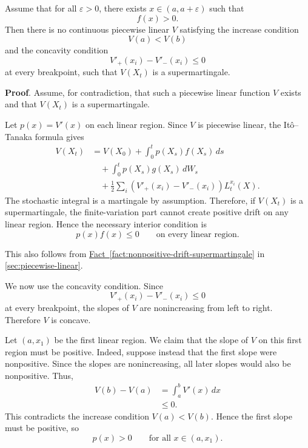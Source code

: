 \begin{fact}
Assume that for all $\varepsilon>0$, there exists
$x\in(a,a+\varepsilon)$ such that
\begin{equation}
f(x)>0.
\label{eq:positive-drift-arbitrarily-close}
\end{equation}
Then there is no continuous piecewise linear $V$ satisfying the increase
condition
\begin{equation}
V(a)<V(b)
\end{equation}
and the concavity condition
\begin{equation}
V'_{+}(x_i)-V'_{-}(x_i)\leq 0
\end{equation}
at every breakpoint, such that $V(X_t)$ is a supermartingale.

\textbf{Proof}. Assume, for contradiction, that such a piecewise linear function $V$ exists
and that $V(X_t)$ is a supermartingale.

Let $p(x)=V'(x)$ on each linear region. Since $V$ is piecewise linear, the
Itô--Tanaka formula gives
\begin{align}
    V(X_t)
    &=
    V(X_0)
    +
    \int_0^t p(X_s)f(X_s)\,ds                                      \\
    &\quad
    +
    \int_0^t p(X_s)g(X_s)\,dW_s                                    \\
    &\quad
    +
    \frac12\sum_i
    \left(V'_+(x_i)-V'_-(x_i)\right)L_t^{x_i}(X).
\end{align}
The stochastic integral is a martingale by assumption. Therefore, if
$V(X_t)$ is a supermartingale, the finite-variation part cannot create
positive drift on any linear region. Hence the necessary interior condition
is
\begin{equation}
    p(x)f(x)\leq 0
    \qquad
    \text{on every linear region.}
    \label{eq:necessary-interior-condition-pl}
\end{equation}

This also follows from \hyperref[fact:nonpositive-drift-supermartingale]
  {Fact~\ref*{fact:nonpositive-drift-supermartingale}}
in \autoref{sec:piecewise-linear}.

We now use the concavity condition. Since
\begin{equation}
    V'_+(x_i)-V'_-(x_i)\leq 0
\end{equation}
at every breakpoint, the slopes of $V$ are nonincreasing from left to
right. Therefore $V$ is concave.

Let $(a,x_1)$ be the first linear region. We claim that the slope of $V$ on
this first region must be positive. Indeed, suppose instead that the first
slope were nonpositive. Since the slopes are nonincreasing, all later
slopes would also be nonpositive. Thus,
\begin{align}
    V(b)-V(a)
    &=
    \int_a^b V'(x)\,dx                                             \\
    &\leq 0.
\end{align}
This contradicts the increase condition $V(a)<V(b)$. Hence the first slope
must be positive, so
\begin{equation}
    p(x)>0
    \qquad
    \text{for all }x\in(a,x_1).
    \label{eq:first-slope-positive-pl}
\end{equation}


\end{fact}
